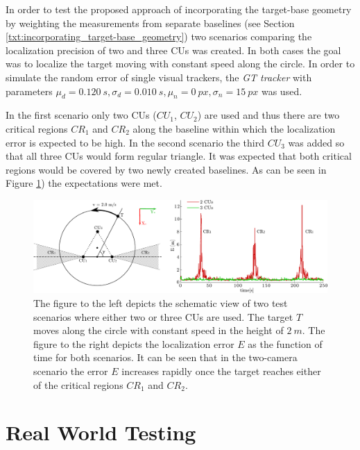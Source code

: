 In order to test the proposed approach of incorporating the target-base geometry by weighting the measurements from separate baselines (see Section \ref{txt:incorporating_target-base_geometry}) two scenarios comparing the localization precision of two and three CUs was created. In both cases the goal was to localize the target moving with constant speed along the circle. In order to simulate the random error of single visual trackers, the \textit{GT tracker} with parameters $\mu_{d} = 0.120~s, \sigma_{d} = 0.010~s, \mu_{n} = 0~px, \sigma_{n} = 15~px$ was used. 

In the first scenario only two CUs ($CU_{1}$, $CU_{2}$) are used and thus there are two critical regions $CR_{1}$ and $CR_{2}$ along the baseline within which the localization error is expected to be high. In the second scenario the third $CU_{3}$ was added so that all three CUs would form regular triangle. It was expected that both critical regions would be covered by two newly created baselines. As can be seen in Figure \ref{fig:test_two_vs_three_cus}) the expectations were met.

\begin{figure}[htb]\centering
	\centering
	\includegraphics[width=0.95\linewidth]{fig/schema_two_vs_three_units_and_plot.pdf}
	\caption{The figure to the left depicts the schematic view of two test scenarios where either two or three CUs are used. The target $T$ moves along the circle with constant speed in the height of $2~m$. The figure to the right depicts the localization error $E$ as the function of time for both scenarios. It can be seen that in the two-camera scenario the error $E$ increases rapidly once the target reaches either of the critical regions $CR_{1}$ and $CR_{2}$.}
	\label{fig:test_two_vs_three_cus}
\end{figure}
	
\section{Real World Testing} \label{txt:real_world_testing}

